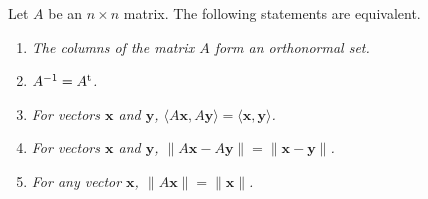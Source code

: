  
\begin{theorem}
Let $A$ be an $n \times n$ matrix.  The following statements are
equivalent. 
\begin{enumerate}
 
\rm \item \it
The columns of the matrix $A$ form an orthonormal set.
 
\rm \item \it
$A^{-1} = A^{\rm t}$.
 
\rm \item \it
For vectors ${\mathbf x}$ and ${\mathbf y}$, $\langle  A{\mathbf x}, A
{\mathbf y} \rangle = \langle  {\mathbf x}, {\mathbf y} \rangle$.
 
\rm \item \it
For vectors ${\mathbf x}$ and ${\mathbf y}$, $\| A{\mathbf x}- A{\mathbf y} \|
=\| {\mathbf x}- {\mathbf y} \|$. 
 
\rm \item \it
For any vector ${\mathbf x}$, $\| A{\mathbf x} \| = \| {\mathbf x}\|$.
 
\end{enumerate}
\end{theorem}
 
